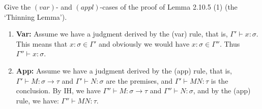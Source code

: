 \begin{problem}{2.15}
    Give the $(var)$- and $(appl)$-cases of the proof of Lemma 2.10.5 (1) (the `Thinning Lemma').
\end{problem}

\begin{solution}
    \begin{enumerate}
        \item \textbf{Var:} Assume we have a judgment derived by the (var) rule, that is, $\Gamma' \vdash x:\sigma$. This means that $x:\sigma \in \Gamma'$ and obviously we would have $x:\sigma \in \Gamma''$. Thus $\Gamma'' \vdash x:\sigma$. 
        \item \textbf{App:} Assume we have a judgment derived by the (app) rule, that is, $\Gamma' \vdash M:\sigma \to \tau$ and $\Gamma' \vdash N:\sigma$ are the premises, and $\Gamma' \vdash MN : \tau$ is the conclusion.
                By IH, we have $\Gamma'' \vdash M:\sigma \to \tau$ and $\Gamma'' \vdash N:\sigma$, and by the (app) rule, we have: $\Gamma'' \vdash MN:\tau$.
    \end{enumerate}
\end{solution}